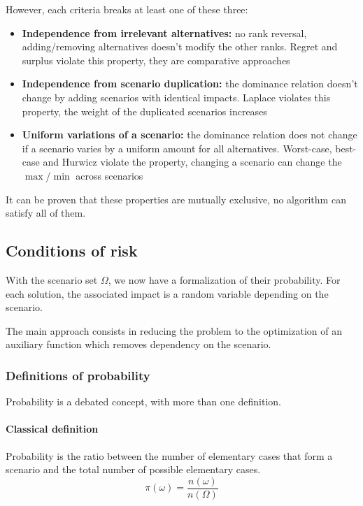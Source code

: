 However, each criteria breaks at least one of these three: 
\begin{itemize}
	\item \textbf{Independence from irrelevant alternatives:} no rank reversal, adding/removing alternatives doesn't modify the other ranks. Regret and surplus violate this property, they are comparative approaches
	
	\item \textbf{Independence from scenario duplication:} the dominance relation doesn't change by adding scenarios with identical impacts. Laplace violates this property, the weight of the duplicated scenarios increases
	
	\item \textbf{Uniform variations of a scenario:} the dominance relation does not change if a scenario varies by a uniform amount for all alternatives. Worst-case, best-case and Hurwicz violate the property, changing a scenario can change the $\max$/$\min$ across scenarios
\end{itemize}

It can be proven that these properties are mutually exclusive, no algorithm can satisfy all of them.

\subsection{Conditions of risk}

With the scenario set $\Omega$, we now have a formalization of their probability. For each solution, the associated impact is a random variable depending on the scenario. 

The main approach consists in reducing the problem to the optimization of an auxiliary function which removes dependency on the scenario. 

\subsubsection{Definitions of probability}

Probability is a debated concept, with more than one definition.

\paragraph{Classical definition} Probability is the ratio between the number of elementary cases that form a scenario and the total number of possible elementary cases. 
$$ \pi (\omega) = \frac{n(\omega)}{n (\Omega)}$$

